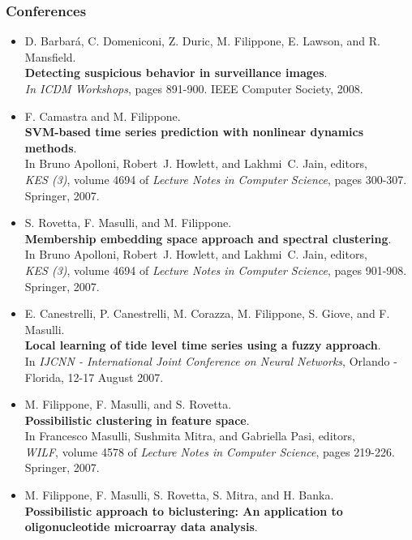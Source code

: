 \documentclass[a4paper,10pt]{article}
\begin{document}
\subsubsection*{Conferences}
\begin{itemize}
     \item  D. Barbar\'{a}, C. Domeniconi, Z. Duric, M. Filippone, E. Lawson, and R. Mansfield.
       \\\textbf{Detecting suspicious behavior in surveillance images}.
       \\\emph{In ICDM Workshops}, pages 891-900. IEEE Computer Society, 2008. 
     \item  F. Camastra and M. Filippone.
       \\\textbf{SVM-based time series prediction with nonlinear dynamics methods}.
       \\In Bruno Apolloni, Robert~J. Howlett, and Lakhmi~C. Jain, editors,
       \\\emph{KES (3)}, volume 4694 of \emph{Lecture Notes in Computer Science}, pages 300-307. Springer, 2007.
     \item  S. Rovetta, F. Masulli, and M. Filippone.
       \\\textbf{Membership embedding space approach and spectral clustering}.
       \\In Bruno Apolloni, Robert~J. Howlett, and Lakhmi~C. Jain, editors,
       \\\emph{KES (3)}, volume 4694 of \emph{Lecture Notes in Computer Science}, pages 901-908. Springer, 2007.
     \item  E. Canestrelli, P. Canestrelli, M. Corazza, M. Filippone, S. Giove, and F. Masulli.
       \\\textbf{Local learning of tide level time series using a fuzzy approach}.
       \\In \emph{IJCNN - International Joint Conference on Neural Networks}, Orlando - Florida, 12-17 August 2007.
     \item  M. Filippone, F. Masulli, and S. Rovetta.
       \\\textbf{Possibilistic clustering in feature space}.
       \\In Francesco Masulli, Sushmita Mitra, and Gabriella Pasi, editors,
       \\\emph{WILF}, volume 4578 of \emph{Lecture Notes in Computer Science}, pages 219-226. Springer, 2007.
     \item  M. Filippone, F. Masulli, S. Rovetta, S. Mitra, and H. Banka.
       \\\textbf{Possibilistic approach to biclustering: An application to oligonucleotide microarray data analysis}.

\end{itemize}
\end{document}
